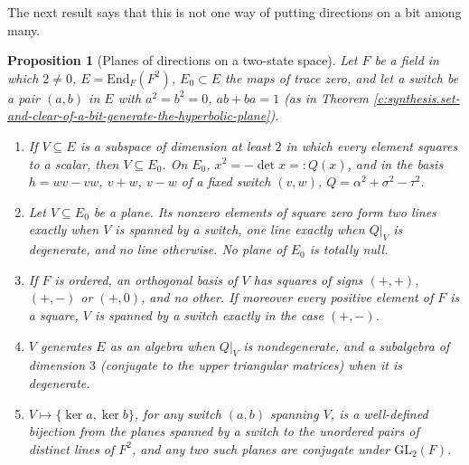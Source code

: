 \documentclass[11pt]{article}
\newtheorem{proposition}[theorem]{Proposition}
\theoremstyle{definition}
\theoremstyle{plain}
\newcommand{\changedmark}[2]{\marginpar{\raggedright\scriptsize\color{#1}#2}}
\begin{document}
\label{c:note.geometry-first.setting-switch-what-bit-does-3}
The next result says that this is not one way of putting directions on a bit among many.

\begin{proposition}[Planes of directions on a two-state space]\label{c:synthesis.switch-planes-on-a-two-state-space}
\changedmark{BurntOrange}{changed since the deposit}
Let $F$ be a field in which $2 \ne 0$, $E = \mathrm{End}_{F}(F^{2})$, $E_{0} \subset E$ the maps of trace zero, and let a \emph{switch} be a pair $(a, b)$ in $E$ with $a^{2} = b^{2} = 0$, $ab + ba = 1$ (as in Theorem \ref{c:synthesis.set-and-clear-of-a-bit-generate-the-hyperbolic-plane}).
\begin{enumerate}
\item[(i)] If $V \subseteq E$ is a subspace of dimension at least $2$ in which every element squares to a scalar, then $V \subseteq E_{0}$. On $E_{0}$, $x^{2} = -\det x =: Q(x)$, and in the basis $h = wv - vw$, $v + w$, $v - w$ of a fixed switch $(v,w)$, $Q = \alpha^{2} + \sigma^{2} - \tau^{2}$.
\item[(ii)] Let $V \subseteq E_{0}$ be a plane. Its nonzero elements of square zero form two lines exactly when $V$ is spanned by a switch, one line exactly when $Q|_{V}$ is degenerate, and no line otherwise. No plane of $E_{0}$ is totally null.
\item[(iii)] If $F$ is ordered, an orthogonal basis of $V$ has squares of signs $(+,+)$, $(+,-)$ or $(+,0)$, and no other. If moreover every positive element of $F$ is a square, $V$ is spanned by a switch exactly in the case $(+,-)$.
\item[(iv)] $V$ generates $E$ as an algebra when $Q|_{V}$ is nondegenerate, and a subalgebra of dimension $3$ (conjugate to the upper triangular matrices) when it is degenerate.
\item[(v)] $V \mapsto \{\ker a, \ker b\}$, for any switch $(a,b)$ spanning $V$, is a well-defined bijection from the planes spanned by a switch to the unordered pairs of distinct lines of $F^{2}$, and any two such planes are conjugate under $\mathrm{GL}_{2}(F)$.
\end{enumerate}
\end{proposition}
\end{document}
